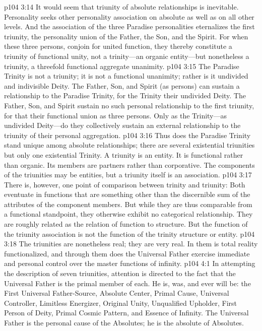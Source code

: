 \pc \vs p104 3:14 It would seem that triunity of absolute relationships is inevitable. Personality seeks other personality association on absolute as well as on all other levels. And the association of the three Paradise personalities eternalizes the first triunity, the personality union of the Father, the Son, and the Spirit. For when these three persons,  conjoin for united function, they thereby constitute a triunity of functional unity, not a trinity---an organic entity---but nonetheless a triunity, a threefold functional aggregate unanimity.
\vs p104 3:15 The Paradise Trinity is not a triunity; it is not a functional unanimity; rather is it undivided and indivisible Deity. The Father, Son, and Spirit (as persons) can sustain a relationship to the Paradise Trinity, for the Trinity  their undivided Deity. The Father, Son, and Spirit sustain no such personal relationship to the first triunity, for that  their functional union as three persons. Only as the Trinity---as undivided Deity---do they collectively sustain an external relationship to the triunity of their personal aggregation.
\vs p104 3:16 Thus does the Paradise Trinity stand unique among absolute relationships; there are several existential triunities but only one existential Trinity. A triunity is  an entity. It is functional rather than organic. Its members are partners rather than corporative. The components of the triunities may be entities, but a triunity itself is an association.
\vs p104 3:17 There is, however, one point of comparison between trinity and triunity: Both eventuate in functions that are something other than the discernible sum of the attributes of the component members. But while they are thus comparable from a functional standpoint, they otherwise exhibit no categorical relationship. They are roughly related as the relation of function to structure. But the function of the triunity association is not the function of the trinity structure or entity.
\vs p104 3:18 The triunities are nonetheless real; they are very real. In them is total reality functionalized, and through them does the Universal Father exercise immediate and personal control over the master functions of infinity.
\vs p104 4:1 In attempting the description of seven triunities, attention is directed to the fact that the Universal Father is the primal member of each. He is, was, and ever will be: the First Universal Father\hyp{}Source, Absolute Center, Primal Cause, Universal Controller, Limitless Energizer, Original Unity, Unqualified Upholder, First Person of Deity, Primal Cosmic Pattern, and Essence of Infinity. The Universal Father is the personal cause of the Absolutes; he is the absolute of Absolutes.
